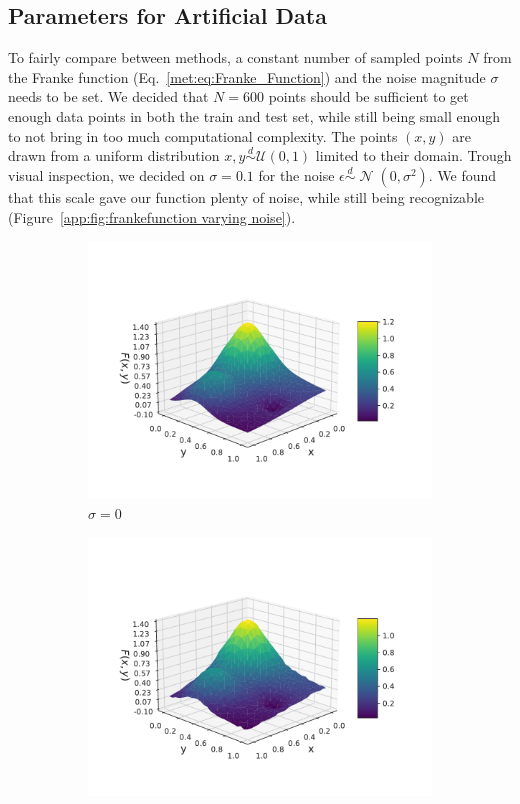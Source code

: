 \documentclass[twocolumn,english,notitlepage]{article}
\newcommand{\pclosed}[1]{\left(#1\right)}
\newcommand{\normal}[2]{\operatorname{\mathcal{N}}\pclosed{#1,#2}}
\newcommand{\distas}{\overset{d}{\sim}}
\begin{document}
\begin{appendices}
    \section{Parameters for Artificial Data} \label{app:sec:frankefunction N and sigma}
        To fairly compare between methods, a constant number of sampled points $N$ from the Franke function (Eq.~\ref{met:eq:Franke_Function}) and the noise magnitude $\sigma$ needs to be set. We decided that $N = 600$ points should be sufficient to get enough data points in both the train and test set, while still being small enough to not bring in too much computational complexity. The points $(x,y)$ are drawn from a uniform distribution $x,y \distas \mathcal{U}(0,1)$ limited to their domain. Trough visual inspection, we decided on $\sigma = 0.1$ for the noise $\epsilon \distas \normal{0}{\sigma^2}$. We found that this scale gave our function plenty of noise, while still being recognizable (Figure~\ref{app:fig:frankefunction varying noise}).   
        \begin{figure}
            \begin{subfigure}{.5\textwidth}
                \centering
                \includegraphics[width=.9\linewidth]{franke_functions_0.pdf}
                \caption{$\sigma = 0$}
                \end{subfigure}
            \hfill
            \begin{subfigure}{.5\textwidth}
                \centering
                \includegraphics[width=.9\linewidth]{franke_functions_0_01.pdf}

\end{subfigure}
\end{figure}
\end{appendices}
\end{document}
